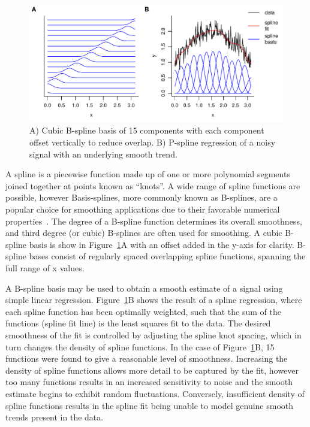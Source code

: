 \documentclass[num-refs]{wiley-article}
\begin{document}
\begin{figure}
  \begin{center}
    \includegraphics[width=1\textwidth]{fig1}
    \caption{A) Cubic B-spline basis of 15 components with each component offset vertically to reduce overlap. B) P-spline regression of a noisy signal with an underlying smooth trend.}
    \label{bspline_regression}
  \end{center}
\end{figure}

A spline is a piecewise function made up of one or more polynomial segments joined together at points known as ``knots''. A wide range of spline functions are possible, however Basis-splines, more commonly known as B-splines, are a popular choice for smoothing applications due to their favorable numerical properties~\cite{DeBoor2001}. The degree of a B-spline function determines its overall smoothness, and third degree (or cubic) B-splines are often used for smoothing. A cubic B-spline basis is show in Figure~\ref{bspline_regression}A with an offset added in the y-axis for clarity. B-spline bases consist of regularly spaced overlapping spline functions, spanning the full range of x values.

A B-spline basis may be used to obtain a smooth estimate of a signal using simple linear regression. Figure~\ref{bspline_regression}B shows the result of a spline regression, where each spline function has been optimally weighted, such that the sum of the functions (spline fit line) is the least squares fit to the data. The desired smoothness of the fit is controlled by adjusting the spline knot spacing, which in turn changes the density of spline functions. In the case of Figure~\ref{bspline_regression}B, 15 functions were found to give a reasonable level of smoothness. Increasing the density of spline functions allows more detail to be captured by the fit, however too many functions results in an increased sensitivity to noise and the smooth estimate begins to exhibit random fluctuations. Conversely, insufficient density of spline functions results in the spline fit being unable to model genuine smooth trends present in the data.
\end{document}

